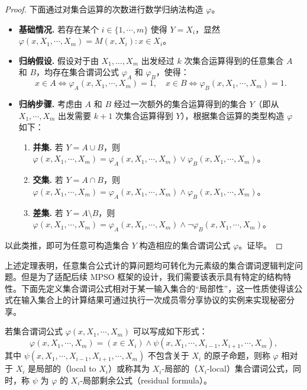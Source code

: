 \begin{proof}
下面通过对集合运算的次数进行数学归纳法构造 $\varphi$。
\begin{itemize}
    \item \textbf{基础情况.} 若存在某个 $i \in \{1, \cdots, m\}$ 使得 $Y = X_i$，显然 $\varphi(x, X_1, \cdots, X_m) = M(x, X_i): x \in X_i$。
    \item \textbf{归纳假设.} 假设对于由 $X_1, \dots, X_m$ 出发经过 $k$ 次集合运算得到的任意集合 $A$ 和 $B$，均存在集合谓词公式 $\varphi_A$ 和 $\varphi_B$，使得：
    $$x \in A \iff \varphi_A(x, X_1, \cdots, X_m) = 1, \quad x \in B \iff \varphi_B(x, X_1, \cdots, X_m) = 1.$$
    \item \textbf{归纳步骤.} 考虑由 $A$ 和 $B$ 经过一次额外的集合运算得到的集合 $Y$（即从 $X_1, \cdots, X_m$ 出发需要 $k+1$ 次集合运算得到 $Y$），根据集合运算的类型构造 $\varphi$ 如下：
    \begin{enumerate}
        \item \textbf{并集.} 若 $Y = A \cup B$，则 $\varphi(x, X_1, \cdots, X_m) = \varphi_A(x, X_1, \cdots, X_m) \lor \varphi_B(x, X_1, \cdots, X_m)$。
        \item \textbf{交集.} 若 $Y = A \cap B$，则 $\varphi(x, X_1, \cdots, X_m) = \varphi_A(x, X_1, \cdots, X_m) \land \varphi_B(x, X_1, \cdots, X_m)$。
        \item \textbf{差集.} 若 $Y = A \setminus B$，则 $\varphi(x, X_1, \cdots, X_m) = \varphi_A(x, X_1, \cdots, X_m) \land \neg \varphi_B(x, X_1, \cdots, X_m)$。
    \end{enumerate}
\end{itemize}
以此类推，即可为任意可构造集合 $Y$ 构造相应的集合谓词公式 $\varphi$。证毕。
\end{proof}

上述定理表明，任意集合公式计的算问题均可转化为元素级的集合谓词逻辑判定问题。但是为了适配后续 MPSO 框架的设计，我们需要该表示具有特定的结构特性。下面先定义集合谓词公式相对于某一输入集合的“局部性”，这一性质使得该公式在输入集合上的计算结果可通过执行一次成员零分享协议的实例来实现秘密分享。


\begin{definition}[局部性]\label{def:local}
若集合谓词公式 $\varphi(x, X_1, \cdots, X_m)$ 可以写成如下形式：
$$\varphi(x, X_1, \cdots, X_m) = (x \in X_i) \land \psi(x, X_1, \cdots, X_{i-1}, X_{i+1}, \cdots, X_m),$$
其中 $\psi(x, X_1, \cdots, X_{i-1}, X_{i+1}, \cdots, X_m)$ 不包含关于 $X_i$ 的原子命题，则称 $\varphi$ 相对于 $X_i$ 是局部的（local to $X_i$）或称其为 $X_i$-局部的（$X_i$-local）集合谓词公式，同时，称 $\psi$ 为 $\varphi$ 的 $X_i$-局部剩余公式（residual formula）。
\end{definition}

